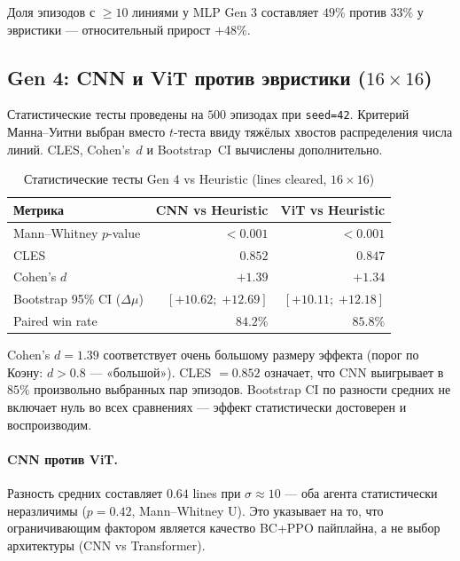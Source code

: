 \documentclass[12pt, a4paper]{article}
\begin{document}
Доля эпизодов с $\geq 10$ линиями у MLP Gen 3 составляет $49\%$ против $33\%$ у эвристики --- относительный прирост $+48\%$.

\subsection{Gen 4: CNN и ViT против эвристики (\texorpdfstring{$16\times16$}{16x16})}
\label{sec:stat_gen4}

Статистические тесты проведены на $500$ эпизодах при \texttt{seed=42}. Критерий Манна--Уитни выбран вместо $t$-теста ввиду тяжёлых хвостов распределения числа линий. CLES, Cohen's~$d$ и Bootstrap~CI вычислены дополнительно.

\begin{table}[H]
  \centering
  \caption{Статистические тесты Gen 4 vs Heuristic (lines cleared, $16\times16$)}
  \label{tab:stat_gen4}
  \small
  \begin{tabular}{lrr}
    \toprule
    \textbf{Метрика} & \textbf{CNN vs Heuristic} & \textbf{ViT vs Heuristic} \\
    \midrule
    Mann--Whitney $p$-value              & $<0.001$                  & $<0.001$                  \\
    CLES                                 & $0.852$                   & $0.847$                   \\
    Cohen's $d$                          & $+1.39$                   & $+1.34$                   \\
    Bootstrap 95\% CI ($\Delta\mu$)      & $[{+10.62};\;{+12.69}]$   & $[{+10.11};\;{+12.18}]$   \\
    Paired win rate                      & $84.2\%$                  & $85.8\%$                  \\
    \bottomrule
  \end{tabular}
\end{table}

Cohen's $d = 1.39$ соответствует очень большому размеру эффекта (порог по Коэну: $d > 0.8$ --- «большой»). CLES $= 0.852$ означает, что CNN выигрывает в $85\%$ произвольно выбранных пар эпизодов. Bootstrap CI по разности средних не включает нуль во всех сравнениях --- эффект статистически достоверен и воспроизводим.

\paragraph{CNN против ViT.} Разность средних составляет $0.64$ lines при $\sigma \approx 10$ --- оба агента статистически неразличимы ($p = 0.42$, Mann--Whitney U). Это указывает на то, что ограничивающим фактором является качество BC+PPO пайплайна, а не выбор архитектуры (CNN vs Transformer).
\end{document}
